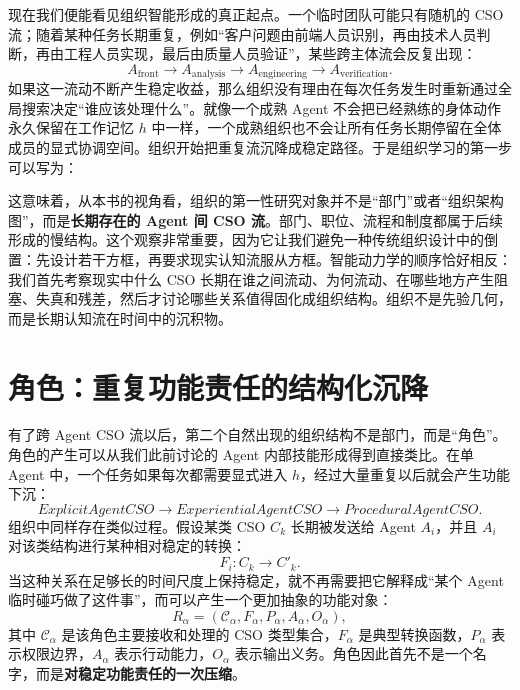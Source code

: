 现在我们便能看见组织智能形成的真正起点。一个临时团队可能只有随机的 CSO 流；随着某种任务长期重复，例如“客户问题由前端人员识别，再由技术人员判断，再由工程人员实现，最后由质量人员验证”，某些跨主体流会反复出现：
\[
A_{\mathrm{front}}
\rightarrow
A_{\mathrm{analysis}}
\rightarrow
A_{\mathrm{engineering}}
\rightarrow
A_{\mathrm{verification}}.
\]
如果这一流动不断产生稳定收益，那么组织没有理由在每次任务发生时重新通过全局搜索决定“谁应该处理什么”。就像一个成熟 Agent 不会把已经熟练的身体动作永久保留在工作记忆 $h$ 中一样，一个成熟组织也不会让所有任务长期停留在全体成员的显式协调空间。组织开始把重复流沉降成稳定路径。于是组织学习的第一步可以写为：
\begin{statementbox}
\centering
{}
\end{statementbox}

这意味着，从本书的视角看，组织的第一性研究对象并不是“部门”或者“组织架构图”，而是\textbf{长期存在的 Agent 间 CSO 流}。部门、职位、流程和制度都属于后续形成的慢结构。这个观察非常重要，因为它让我们避免一种传统组织设计中的倒置：先设计若干方框，再要求现实认知流服从方框。智能动力学的顺序恰好相反：我们首先考察现实中什么 CSO 长期在谁之间流动、为何流动、在哪些地方产生阻塞、失真和残差，然后才讨论哪些关系值得固化成组织结构。组织不是先验几何，而是长期认知流在时间中的沉积物。


\section{角色：重复功能责任的结构化沉降}
\label{sec:organizational-role}

有了跨 Agent CSO 流以后，第二个自然出现的组织结构不是部门，而是“角色”。角色的产生可以从我们此前讨论的 Agent 内部技能形成得到直接类比。在单 Agent 中，一个任务如果每次都需要显式进入 $h$，经过大量重复以后就会产生功能下沉：
\[
ExplicitAgentCSO
\rightarrow
ExperientialAgentCSO
\rightarrow
ProceduralAgentCSO.
\]
组织中同样存在类似过程。假设某类 CSO $C_k$ 长期被发送给 Agent $A_i$，并且 $A_i$ 对该类结构进行某种相对稳定的转换：
\[
F_i:C_k\rightarrow C'_k.
\]
当这种关系在足够长的时间尺度上保持稳定，就不再需要把它解释成“某个 Agent 临时碰巧做了这件事”，而可以产生一个更加抽象的功能对象：
\[
R_\alpha
=
\left(
\mathcal C_\alpha,
F_\alpha,
P_\alpha,
A_\alpha,
O_\alpha
\right),
\]
其中 $\mathcal C_\alpha$ 是该角色主要接收和处理的 CSO 类型集合，$F_\alpha$ 是典型转换函数，$P_\alpha$ 表示权限边界，$A_\alpha$ 表示行动能力，$O_\alpha$ 表示输出义务。角色因此首先不是一个名字，而是\textbf{对稳定功能责任的一次压缩}。

